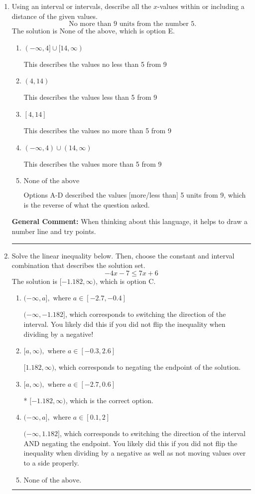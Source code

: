 \documentclass{extbook}[14pt]
\newcommand{\litem}[1]{\item #1

\rule{\textwidth}{0.4pt}}
\begin{document}
\begin{enumerate}\litem{
Using an interval or intervals, describe all the $x$-values within or including a distance of the given values.
\[ \text{ No more than } 9 \text{ units from the number } 5. \]
The solution is \( \text{None of the above} \), which is option E.\begin{enumerate}[label=\Alph*.]
\item \( (-\infty, 4] \cup [14, \infty) \)

This describes the values no less than 5 from 9
\item \( (4, 14) \)

This describes the values less than 5 from 9
\item \( [4, 14] \)

This describes the values no more than 5 from 9
\item \( (-\infty, 4) \cup (14, \infty) \)

This describes the values more than 5 from 9
\item \( \text{None of the above} \)

Options A-D described the values [more/less than] 5 units from 9, which is the reverse of what the question asked.
\end{enumerate}

\textbf{General Comment:} When thinking about this language, it helps to draw a number line and try points.
}
\litem{
Solve the linear inequality below. Then, choose the constant and interval combination that describes the solution set.
\[ -4x -7 \leq 7x + 6 \]
The solution is \( [-1.182, \infty) \), which is option C.\begin{enumerate}[label=\Alph*.]
\item \( (-\infty, a], \text{ where } a \in [-2.7, -0.4] \)

 $(-\infty, -1.182]$, which corresponds to switching the direction of the interval. You likely did this if you did not flip the inequality when dividing by a negative!
\item \( [a, \infty), \text{ where } a \in [-0.3, 2.6] \)

 $[1.182, \infty)$, which corresponds to negating the endpoint of the solution.
\item \( [a, \infty), \text{ where } a \in [-2.7, 0.6] \)

* $[-1.182, \infty)$, which is the correct option.
\item \( (-\infty, a], \text{ where } a \in [0.1, 2] \)

 $(-\infty, 1.182]$, which corresponds to switching the direction of the interval AND negating the endpoint. You likely did this if you did not flip the inequality when dividing by a negative as well as not moving values over to a side properly.
\item \( \text{None of the above}. \)


\end{enumerate}}
\end{enumerate}
\end{document}
